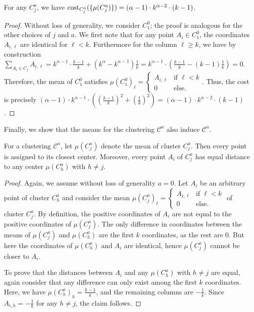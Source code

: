 \begin{fact}
\label{fact:cost}
For any $C_j^a$, we have $\text{cost}_{C_j^a}(\{\mu(C_j^a)\}) = (\alpha-1)\cdot k^{\alpha-2}\cdot (k-1)$.
\end{fact}
\begin{proof}
Without loss of generality, we consider $C_1^0$; the proof is analogous for the other choices of $j$ and $a$. We first note that for any point $A_i \in C_1^0$, the coordinates $A_{i,\ell}$ are identical for $\ell <k$. Furthermore for the column $\ell\geq k$, we have by construction $\sum_{A_i\in C_j} A_{i,\ell} = k^{\alpha-1}\cdot \frac{k-1}{k} + (k^{\alpha}-k^{\alpha-1})\frac{1}{k}=k^{\alpha-1}\cdot (\frac{k-1}{k} - (k-1)\frac{1}{k}) = 0.$ Therefore, the mean of $C_1^0$ satisfies $\mu(C_1^0)_{\ell} = \begin{cases}A_{i,\ell} &\text{if }\ell<k \\
0 &\text{else.}\end{cases}$. 
Thus, the cost is precisely $(\alpha-1)\cdot k^{\alpha-1}\cdot \left(\left(\frac{k-1}{k}\right)^2 + \left(\frac{1}{k}\right)^2 \right)=(\alpha-1)\cdot k^{\alpha-2}\cdot (k-1)$.
\end{proof}

Finally, we show that the means for the clustering $\mathcal{C}^{a}$ also induce $\mathcal{C}^{a}$.

\begin{fact}
\label{fact:opt}
For a clustering $\mathcal{C}^{a}$, let $\mu(C_j^{a})$ denote the mean of cluster $C_j^a$. Then every point  is assigned to its closest center. Moreover, every point $A_i$ of $C_j^a$ has equal distance to any center $\mu(C_h^{a})$ with $h\neq j$.
\end{fact}
\begin{proof}
Again, we assume without loss of generality $a=0$.
Let $A_i$ be an arbitrary point of cluster $C_{h}^{a}$ and consider the mean $\mu(C_j^a)_{\ell} = \begin{cases}A_{i,\ell} &\text{if }\ell<k \\
0 &\text{else.}\end{cases}$ of cluster $C_j^a$. By definition, the positive coordinates of $A_i$ are not equal to the positive coordinates of $\mu(C_j^a)$. The only difference in coordinates between the means of $\mu(C_j^a)$ and $\mu(C_h^a)$ are the first $k$ coordinates, as the rest are $0$.
But here the coordinates of $\mu(C_h^a)$ and $A_i$ are identical, hence $\mu(C_j^a)$ cannot be closer to $A_i$.

To prove that the distances between $A_i$ and any $\mu(C_h^{a})$ with $h\neq j$ are equal, again consider that any difference can only exist among the first $k$ coordinates. Here, we have $\mu(C_h^{a})_h = \frac{k-1}{k}$, and the remaining columns are $-\frac{1}{k}$. Since $A_{i,h} = -\frac{1}{k}$ for any $h\neq j$, the claim follows.
\end{proof}

